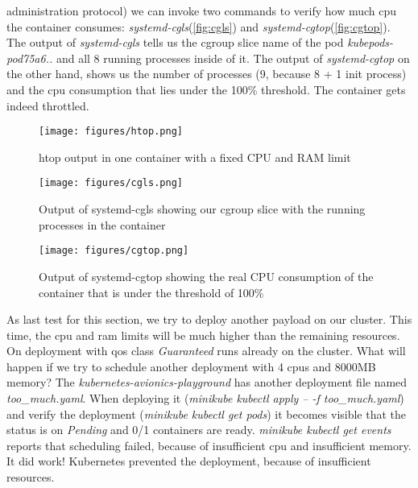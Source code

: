\documentclass[titlepage]{report}
\begin{document}
administration protocol) we can invoke two commands to verify how much \gls{cpu} the container consumes: \emph{systemd-cgls}(\autoref{fig:cgls}) and \emph{systemd-cgtop}(\autoref{fig:cgtop}). The output of \emph{systemd-cgls} tells us
the cgroup slice name of the pod \emph{kubepods-pod75a6..} and all 8 running processes inside of it. The output of \emph{systemd-cgtop} on the other hand, shows us the number of processes (9, because 8 + 1 init process) and the
\gls{cpu} consumption that lies under the 100\% threshold. The container gets indeed throttled.
\begin{figure}[H]
  \centering
  \texttt{[image: figures/htop.png]}
  \caption{htop output in one container with a fixed CPU and RAM limit}\label{fig:htop}
\end{figure}
\begin{figure}[H]
  \centering
  \texttt{[image: figures/cgls.png]}
  \caption{Output of systemd-cgls showing our cgroup slice with the running processes in the container}\label{fig:cgls}
\end{figure}
\begin{figure}[H]
  \centering
  \texttt{[image: figures/cgtop.png]}
  \caption{Output of systemd-cgtop showing the real CPU consumption of the container that is under the threshold of 100\%}\label{fig:cgtop}
\end{figure}
As last test for this section, we try to deploy another payload on our cluster. This time, the \gls{cpu} and \gls{ram} limits will be much higher than the remaining resources.
On deployment with \gls{qos} class \emph{Guaranteed} runs already on the cluster. What will happen if we try to schedule another deployment with 4 \glspl{cpu} and 8000MB memory?
The \emph{kubernetes-avionics-playground} has another deployment file named \emph{too\_much.yaml}. When deploying it (\emph{minikube kubectl apply -- -f too\_much.yaml})
and verify the deployment (\emph{minikube kubectl get pods}) it becomes visible that the status is on \emph{Pending} and 0/1 containers are ready. \emph{minikube kubectl get events}
reports that scheduling failed, because of insufficient \gls{cpu} and insufficient memory. It did work! Kubernetes prevented the deployment, because of insufficient resources.
\end{document}

